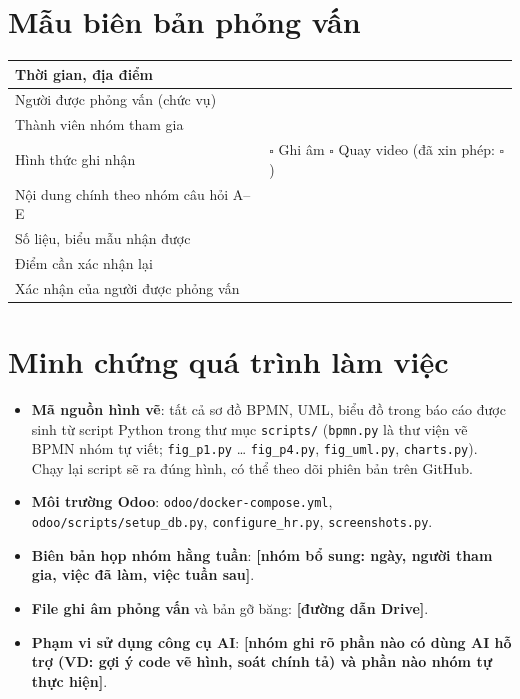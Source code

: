 \documentclass[12pt,a4paper,oneside]{report}
\newcommand{\todo}[1]{\textcolor{warn}{\textbf{[#1]}}}
\begin{document}
\chapter{Mẫu biên bản phỏng vấn}
\begin{tabularx}{\linewidth}{|L{4cm}|Y|}
\hline Thời gian, địa điểm & \\\hline
Người được phỏng vấn (chức vụ) & \\\hline
Thành viên nhóm tham gia & \\\hline
Hình thức ghi nhận & $\square$ Ghi âm \quad $\square$ Quay video \quad (đã xin phép: $\square$) \\\hline
Nội dung chính theo nhóm câu hỏi A–E & \\[2.5cm]\hline
Số liệu, biểu mẫu nhận được & \\\hline
Điểm cần xác nhận lại & \\\hline
Xác nhận của người được phỏng vấn & \\[1.2cm]\hline
\end{tabularx}

\chapter{Minh chứng quá trình làm việc}
\begin{itemize}
\item \textbf{Mã nguồn hình vẽ}: tất cả sơ đồ BPMN, UML, biểu đồ trong báo cáo được sinh từ script Python trong thư mục \texttt{scripts/} (\texttt{bpmn.py} là thư viện vẽ BPMN nhóm tự viết; \texttt{fig\_p1.py} … \texttt{fig\_p4.py}, \texttt{fig\_uml.py}, \texttt{charts.py}). Chạy lại script sẽ ra đúng hình, có thể theo dõi phiên bản trên GitHub.
\item \textbf{Môi trường Odoo}: \texttt{odoo/docker-compose.yml}, \texttt{odoo/scripts/setup\_db.py}, \texttt{configure\_hr.py}, \texttt{screenshots.py}.
\item \textbf{Biên bản họp nhóm hằng tuần}: \todo{nhóm bổ sung: ngày, người tham gia, việc đã làm, việc tuần sau}.
\item \textbf{File ghi âm phỏng vấn} và bản gỡ băng: \todo{đường dẫn Drive}.
\item \textbf{Phạm vi sử dụng công cụ AI}: \todo{nhóm ghi rõ phần nào có dùng AI hỗ trợ (VD: gợi ý code vẽ hình, soát chính tả) và phần nào nhóm tự thực hiện}.
\end{itemize}
\end{document}
